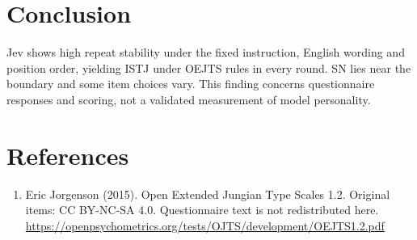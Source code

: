 \documentclass[10pt,a4paper]{article}
\begin{document}
\section{Conclusion}
Jev shows high repeat stability under the fixed instruction, English wording and position order, yielding ISTJ under OEJTS rules in every round. SN lies near the boundary and some item choices vary. This finding concerns questionnaire responses and scoring, not a validated measurement of model personality.
\section*{References}
\begin{enumerate}
\item Eric Jorgenson (2015). Open Extended Jungian Type Scales 1.2. Original items: CC BY-NC-SA 4.0. Questionnaire text is not redistributed here. \url{https://openpsychometrics.org/tests/OJTS/development/OEJTS1.2.pdf}
\end{enumerate}
\end{document}
